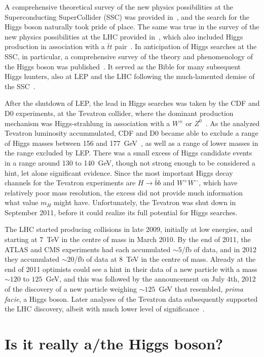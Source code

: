 \documentclass[12pt]{article}
\numberwithin{equation}{section}
\begin{document}
A comprehensive theoretical survey of the new physics possibilities at the Superconducting SuperCollider (SSC)
was provided in~\cite{EHLQ}, and the search for the Higgs boson naturally took pride of place. The same
was true in the survey of the new physics possibilities at the LHC provided in~\cite{EGK}, which also
included Higgs production in association with a ${\bar t} t$ pair~\cite{Zoltan}. In anticipation of Higgs 
searches at the SSC, in particular, a comprehensive survey of the theory and phenomenology of the
Higgs boson was published~\cite{HHG}. It served as the Bible for many subsequent Higgs hunters,
also at LEP and the LHC following the much-lamented demise of the SSC~\cite{Djouadi}.

After the shutdown of LEP, the lead in Higgs searches was taken by the
CDF and D0 experiments, at the Tevatron collider, where the dominant
production mechanism was Higgs-strahlung in association with a $W^\pm$
or $Z^0$~\cite{GNY}. As the analyzed Tevatron luminosity accummulated,
CDF and D0 became able to exclude a range of Higgs masses between 156
and 177~GeV~\cite{TeVH}, as well as a range of lower masses in the
range excluded by LEP. There was a small excess of Higgs candidate
events in a range around 130 to 140~GeV, though not strong enough to
be considered a hint, let alone significant evidence. Since the most
important Higgs decay channels for the Tevatron experiments are $H \to
{\bar b}b$ and $W^+ W^-$, which have relatively poor mass resolution,
the excess did not provide much information what value $m_H$ might
have. Unfortunately, the Tevatron was shut down in September 2011,
before it could realize its full potential for Higgs searches.

The LHC started producing collisions in late 2009, initially at low
energies, and starting at 7~TeV in the centre of mass in March 2010. By
the end of 2011, the ATLAS and CMS experiments had each accumulated
$\sim 5$/fb of data, and in 2012 they accumulated $\sim 20$/fb of data at
8~TeV in the centre of mass. Already at the end of 2011 optimists could see a hint
in their data of a new particle with a mass $\sim 120$ to $125$~GeV, and this was
followed by the announcement on July 4th, 2012 of the discovery of a new particle
weighing $\sim 125$~GeV that resembled, {\it prima facie}, a Higgs boson.
Later analyses of the Tevatron data subsequently supported the
LHC discovery, albeit with much lower level of significance~\cite{TevatronH}.

\section{Is it really a/the Higgs boson?}
\end{document}
